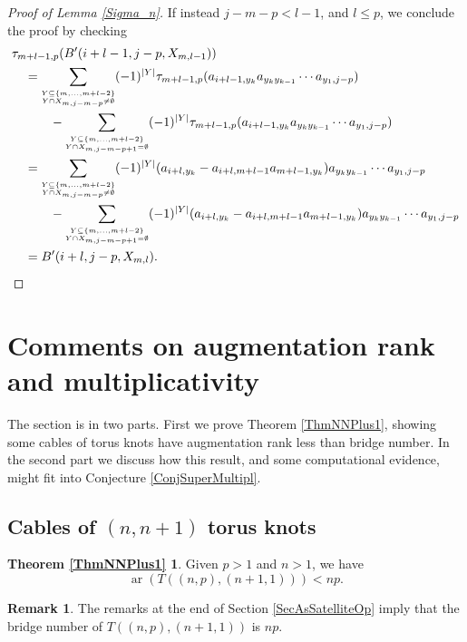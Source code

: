 \documentclass[11pt]{amsart}
\def\ar{\operatorname{ar}}
\theoremstyle{definition}
\newtheorem{rem}[thm]{Remark}
\begin{document}
\begin{proof} [Proof of Lemma \ref{Sigma_n}]
If instead $j-m-p <l - 1$, and $l\le p$, we conclude the proof by checking
{\small
\begin{align*}
&\tau_{m + l - 1,p}(B'(i+l-1,j-p,X_{m,l-1})) \\
&\quad = \sum_{{\scriptscriptstyle \overset{Y\subseteq \{m,\ldots,m+l-2\}}{Y\cap X_{m,j-m-p}\ne\emptyset}}}(-1)^{|Y|}\tau_{m + l - 1,p}(a_{i+l-1,y_k}a_{y_ky_{k-1}}\cdots a_{y_1,j-p}) \\
&\qquad\quad - \sum_{{\scriptscriptstyle \overset{Y\subseteq \{m,\ldots,m+l-2\}}{Y\cap X_{m,j-m-p+1}=\emptyset}}}(-1)^{|Y|}\tau_{m + l - 1,p}(a_{i+l-1,y_k}a_{y_ky_{k-1}}\cdots a_{y_1,j-p}) \\
&\quad = \sum_{{\scriptscriptstyle \overset{Y\subseteq \{m,\ldots,m+l-2\}}{Y\cap X_{m,j-m-p}\ne\emptyset}}}(-1)^{|Y|}(a_{i+l,y_k} - a_{i+l,m+l-1}a_{m+l-1,y_k})a_{y_ky_{k-1}}\cdots a_{y_1,j-p} \\
&\qquad\quad - \sum_{{\scriptscriptstyle \overset{Y\subseteq \{m,\ldots,m+l-2\}}{Y\cap X_{m,j-m-p+1}=\emptyset}}}(-1)^{|Y|}(a_{i+l,y_k} - a_{i+l,m+l-1}a_{m+l-1,y_k})a_{y_ky_{k-1}}\cdots a_{y_1,j-p} \\
&\quad = B'(i+l,j-p,X_{m,l}). \qedhere
\end{align*}
}
\end{proof}

\section{Comments on augmentation rank and multiplicativity}
\label{SecComments}

The section is in two parts. First we prove Theorem \ref{ThmNNPlus1}, showing some cables of torus knots have augmentation rank less than bridge number. In the second part we discuss how this result, and some computational evidence, might fit into Conjecture \ref{ConjSuperMultipl}.

\subsection{Cables of $(n,n+1)$ torus knots}
\label{SecNNPlus1}

\newtheorem*{ThmNNPlus1}{Theorem \ref{ThmNNPlus1}}
\begin{ThmNNPlus1}Given $p>1$ and $n>1$, we have \[\ar(T((n,p),(n+1,1))) < np.\]
\end{ThmNNPlus1}

\begin{rem} The remarks at the end of Section \ref{SecAsSatelliteOp} imply that the bridge number of $T((n,p),(n+1,1))$ is $np$.
\end{rem}
\end{document}
